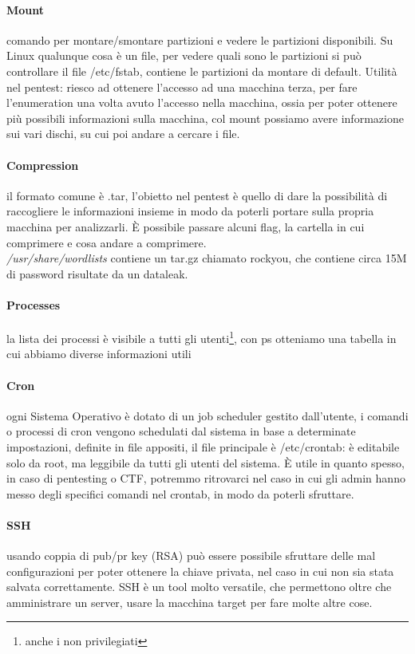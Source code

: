 \documentclass{article}
\begin{document}
\paragraph{Mount}comando per montare/smontare partizioni e vedere le partizioni disponibili. Su Linux qualunque cosa è un file, per vedere quali sono le partizioni si può controllare il file \textsf{/etc/fstab}, contiene le partizioni da montare di default. Utilità nel pentest: riesco ad ottenere l'accesso ad una macchina terza, per fare l'enumeration una volta avuto l'accesso nella macchina, ossia per poter ottenere più possibili informazioni sulla macchina, col mount possiamo avere informazione sui vari dischi, su cui poi andare a cercare i file.
\paragraph{Compression}il formato comune è .tar, l'obietto nel pentest è quello di dare la possibilità di raccogliere le informazioni insieme in modo da poterli portare sulla propria macchina per analizzarli. È possibile passare alcuni flag, la cartella in cui comprimere e cosa andare a comprimere.\\ \textit{/usr/share/wordlists} contiene un tar.gz chiamato rockyou, che contiene circa 15M di password risultate da un dataleak.
\paragraph{Processes} la lista dei processi è visibile a tutti gli utenti\footnote{anche i non privilegiati}, con \textsf{ps} otteniamo una tabella in cui abbiamo diverse informazioni utili
\paragraph{Cron} ogni Sistema Operativo è dotato di un job scheduler gestito dall'utente, i comandi o processi di cron vengono schedulati dal sistema in base a determinate impostazioni, definite in file appositi, il file principale è \textsf{/etc/crontab}: è editabile solo da root, ma leggibile da tutti gli utenti del sistema. È utile in quanto spesso, in caso di pentesting o CTF, potremmo ritrovarci nel caso in cui gli admin hanno messo degli specifici comandi nel crontab, in modo da poterli sfruttare.
\paragraph{SSH} usando coppia di pub/pr key (RSA) può essere possibile sfruttare delle mal configurazioni per poter ottenere la chiave privata, nel caso in cui non sia stata salvata correttamente. SSH è un tool molto versatile, che permettono oltre che amministrare un server, usare la macchina target per fare molte altre cose.
\end{document}
